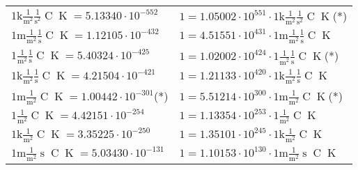 \begin{center}
\begin{longtable}{l l}
{\color{gray}$1 \bm{\mathrm{ k}}\frac1{\operatorname{m}^2}\frac1{\operatorname{s}^2}{\operatorname{C}}{\operatorname{K}} = 5.13340\cdot10^{-552} $}   & {\color{gray}$ 1 = 1.05002\cdot10^{551} \cdot 1 \bm{\mathrm{ k}}\frac1{\operatorname{m}^2}\frac1{\operatorname{s}^2}{\operatorname{C}}{\operatorname{K}}$}\quad(*)\\
{\color{gray}$1 \bm{\mathrm{ m}}\frac1{\operatorname{m}^2}\frac1{\operatorname{s}}{\operatorname{C}}{\operatorname{K}} = 1.12105\cdot10^{-432} $}   & {\color{gray}$ 1 = 4.51551\cdot10^{431} \cdot 1 \bm{\mathrm{ m}}\frac1{\operatorname{m}^2}\frac1{\operatorname{s}}{\operatorname{C}}{\operatorname{K}}$}  \\
{\color{black}$1 \bm{\mathrm{ }}\frac1{\operatorname{m}^2}\frac1{\operatorname{s}}{\operatorname{C}}{\operatorname{K}} = 5.40324\cdot10^{-425} $}   & {\color{black}$ 1 = 1.02002\cdot10^{424} \cdot 1 \bm{\mathrm{ }}\frac1{\operatorname{m}^2}\frac1{\operatorname{s}}{\operatorname{C}}{\operatorname{K}}$}\quad(*)\\
{\color{gray}$1 \bm{\mathrm{ k}}\frac1{\operatorname{m}^2}\frac1{\operatorname{s}}{\operatorname{C}}{\operatorname{K}} = 4.21504\cdot10^{-421} $}   & {\color{gray}$ 1 = 1.21133\cdot10^{420} \cdot 1 \bm{\mathrm{ k}}\frac1{\operatorname{m}^2}\frac1{\operatorname{s}}{\operatorname{C}}{\operatorname{K}}$}  \\
{\color{gray}$1 \bm{\mathrm{ m}}\frac1{\operatorname{m}^2}{}{\operatorname{C}}{\operatorname{K}} = 1.00442\cdot10^{-301} $}\quad(*) & {\color{gray}$ 1 = 5.51214\cdot10^{300} \cdot 1 \bm{\mathrm{ m}}\frac1{\operatorname{m}^2}{}{\operatorname{C}}{\operatorname{K}}$}\quad(*)\\
{\color{black}$1 \bm{\mathrm{ }}\frac1{\operatorname{m}^2}{}{\operatorname{C}}{\operatorname{K}} = 4.42151\cdot10^{-254} $}   & {\color{black}$ 1 = 1.13354\cdot10^{253} \cdot 1 \bm{\mathrm{ }}\frac1{\operatorname{m}^2}{}{\operatorname{C}}{\operatorname{K}}$}  \\
{\color{gray}$1 \bm{\mathrm{ k}}\frac1{\operatorname{m}^2}{}{\operatorname{C}}{\operatorname{K}} = 3.35225\cdot10^{-250} $}   & {\color{gray}$ 1 = 1.35101\cdot10^{245} \cdot 1 \bm{\mathrm{ k}}\frac1{\operatorname{m}^2}{}{\operatorname{C}}{\operatorname{K}}$}  \\
{\color{gray}$1 \bm{\mathrm{ m}}\frac1{\operatorname{m}^2}{\operatorname{s}}{\operatorname{C}}{\operatorname{K}} = 5.03430\cdot10^{-131} $}   & {\color{gray}$ 1 = 1.10153\cdot10^{130} \cdot 1 \bm{\mathrm{ m}}\frac1{\operatorname{m}^2}{\operatorname{s}}{\operatorname{C}}{\operatorname{K}}$}  \\

\end{longtable}
\end{center}
